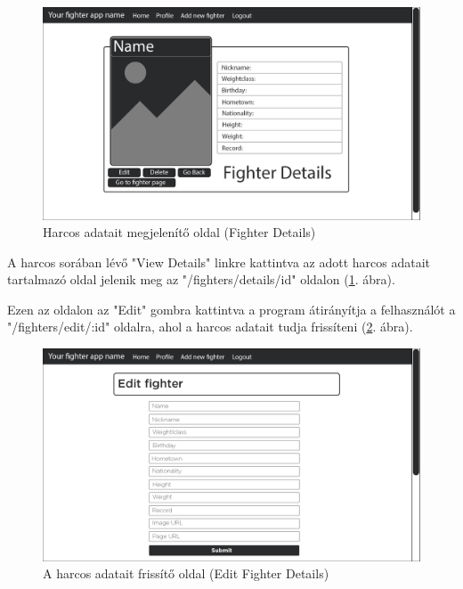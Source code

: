 \begin{figure}[htb]
\centering
\includegraphics[scale=0.7]{kepek/details.jpg}
\caption{Harcos adatait megjelenítő oldal (Fighter Details)}
\label{fig:details}
\end{figure}

A harcos sorában lévő "View Details" linkre kattintva az adott harcos adatait tartalmazó oldal jelenik meg az "/fighters/details/id" oldalon (\ref{fig:details}. ábra).

Ezen az oldalon az "Edit" gombra kattintva a program átirányítja a felhasználót a "/fighters/edit/:id" oldalra, ahol a harcos adatait tudja frissíteni (\ref{fig:edit}. ábra).

\begin{figure}[htb]
\centering
\includegraphics[scale=0.7]{kepek/edit_fighter.jpg}
\caption{A harcos adatait frissítő oldal (Edit Fighter Details)}
\label{fig:edit}
\end{figure}

